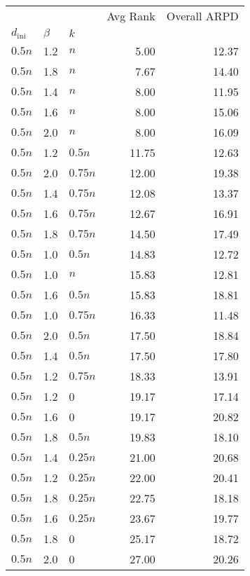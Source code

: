 \begin{tabular}{lllrr}
\toprule
        &     &   & Avg Rank & Overall ARPD \\
$d_\mathrm{ini}$ & $\beta$ & $k$ &          &              \\
\midrule
$0.5n$ & 1.2 & $n$ &     5.00 &        12.37 \\
$0.5n$ & 1.8 & $n$ &     7.67 &        14.40 \\
$0.5n$ & 1.4 & $n$ &     8.00 &        11.95 \\
$0.5n$ & 1.6 & $n$ &     8.00 &        15.06 \\
$0.5n$ & 2.0 & $n$ &     8.00 &        16.09 \\
$0.5n$ & 1.2 & $0.5n$ &    11.75 &        12.63 \\
$0.5n$ & 2.0 & $0.75n$ &    12.00 &        19.38 \\
$0.5n$ & 1.4 & $0.75n$ &    12.08 &        13.37 \\
$0.5n$ & 1.6 & $0.75n$ &    12.67 &        16.91 \\
$0.5n$ & 1.8 & $0.75n$ &    14.50 &        17.49 \\
$0.5n$ & 1.0 & $0.5n$ &    14.83 &        12.72 \\
$0.5n$ & 1.0 & $n$ &    15.83 &        12.81 \\
$0.5n$ & 1.6 & $0.5n$ &    15.83 &        18.81 \\
$0.5n$ & 1.0 & $0.75n$ &    16.33 &        11.48 \\
$0.5n$ & 2.0 & $0.5n$ &    17.50 &        18.84 \\
$0.5n$ & 1.4 & $0.5n$ &    17.50 &        17.80 \\
$0.5n$ & 1.2 & $0.75n$ &    18.33 &        13.91 \\
$0.5n$ & 1.2 & 0 &    19.17 &        17.14 \\
$0.5n$ & 1.6 & 0 &    19.17 &        20.82 \\
$0.5n$ & 1.8 & $0.5n$ &    19.83 &        18.10 \\
$0.5n$ & 1.4 & $0.25n$ &    21.00 &        20.68 \\
$0.5n$ & 1.2 & $0.25n$ &    22.00 &        20.41 \\
$0.5n$ & 1.8 & $0.25n$ &    22.75 &        18.18 \\
$0.5n$ & 1.6 & $0.25n$ &    23.67 &        19.77 \\
$0.5n$ & 1.8 & 0 &    25.17 &        18.72 \\
$0.5n$ & 2.0 & 0 &    27.00 &        20.26 \\

\end{tabular}
